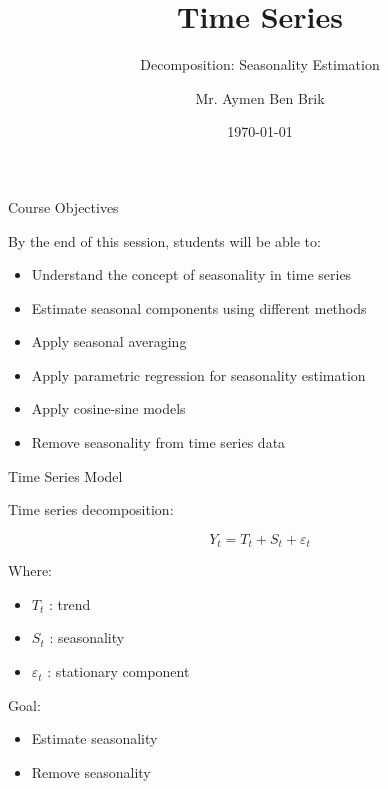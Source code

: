 \documentclass[aspectratio=169]{beamer}
\title{Time Series}
\subtitle{Decomposition: Seasonality Estimation}
\author{Mr. Aymen Ben Brik}
\institute{Time Series Course 1GAMMA}
\date{\today}
\begin{document}
\begin{frame}
\titlepage
\end{frame}

\begin{frame}{Course Objectives}

By the end of this session, students will be able to:

\begin{itemize}

\item Understand the concept of seasonality in time series

\item Estimate seasonal components using different methods

\item Apply seasonal averaging

\item Apply parametric regression for seasonality estimation

\item Apply cosine-sine models

\item Remove seasonality from time series data

\end{itemize}

\end{frame}

\begin{frame}{Time Series Model}

Time series decomposition:

\[
Y_t = T_t + S_t + \varepsilon_t
\]

Where:

\begin{itemize}

\item $T_t$ : trend

\item $S_t$ : seasonality

\item $\varepsilon_t$ : stationary component

\end{itemize}

Goal:

\begin{itemize}
\item Estimate seasonality
\item Remove seasonality
\end{itemize}

\end{frame}
\end{document}
